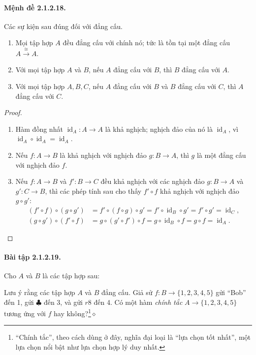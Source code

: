 \paragraph{Mệnh đề 2.1.2.18.} Các sự kiện sau đúng đối với đẳng cấu.
\begin{enumerate}
\item Mọi tập hợp $A$ đều đẳng cấu với chính nó; tức là tồn tại một đẳng cấu $A\xrightarrow{\cong}A$.
\item Với mọi tập hợp $A$ và $B$, nếu $A$ đẳng cấu với $B$, thì $B$ đẳng cấu với $A$.
\item Với mọi tập hợp $A,B,C$, nếu $A$ đẳng cấu với $B$ và $B$ đẳng cấu với $C$, thì $A$ đẳng cấu với $C$.
\end{enumerate}
\begin{proof}
\begin{enumerate}
\item Hàm đồng nhất $\operatorname{id}_A:A\to A$ là khả nghịch; nghịch đảo của nó là $\operatorname{id}_A$, vì $\operatorname{id}_A\circ\operatorname{id}_A=\operatorname{id}_A$.
\item Nếu $f:A\to B$ là khả nghịch với nghịch đảo $g:B\to A$, thì $g$ là một đẳng cấu với nghịch đảo $f$.
\item Nếu $f:A\to B$ và $f':B\to C$ đều khả nghịch với các nghịch đảo $g:B\to A$ và $g':C\to B$, thì các phép tính sau cho thấy $f'\circ f$ khả nghịch với nghịch đảo $g\circ g'$:
\begin{align*}
(f'\circ f)\circ(g\circ g')&=f'\circ(f\circ g)\circ g'=f'\circ\operatorname{id}_B\circ g'=f'\circ g'=\operatorname{id}_C,\\
(g\circ g')\circ(f'\circ f)&=g\circ(g'\circ f')\circ f=g\circ\operatorname{id}_B\circ f=g\circ f=\operatorname{id}_A.
\end{align*}
\end{enumerate}
\end{proof}
\paragraph{Bài tập 2.1.2.19.} Cho $A$ và $B$ là các tập hợp sau:
\begin{center}\end{center}
Lưu ý rằng các tập hợp $A$ và $B$ đẳng cấu. Giả sử $f:B\to\{1,2,3,4,5\}$ gửi ``Bob'' đến 1, gửi $\clubsuit$ đến 3, và gửi $r8$ đến 4. Có một hàm \emph{chính tắc} $A\to\{1,2,3,4,5\}$ tương ứng với $f$ hay không?\footnote{``Chính tắc'', theo cách dùng ở đây, nghĩa đại loại là ``lựa chọn tốt nhất'', một lựa chọn nổi bật như lựa chọn hợp lý duy nhất.}\hfill$\diamond$
